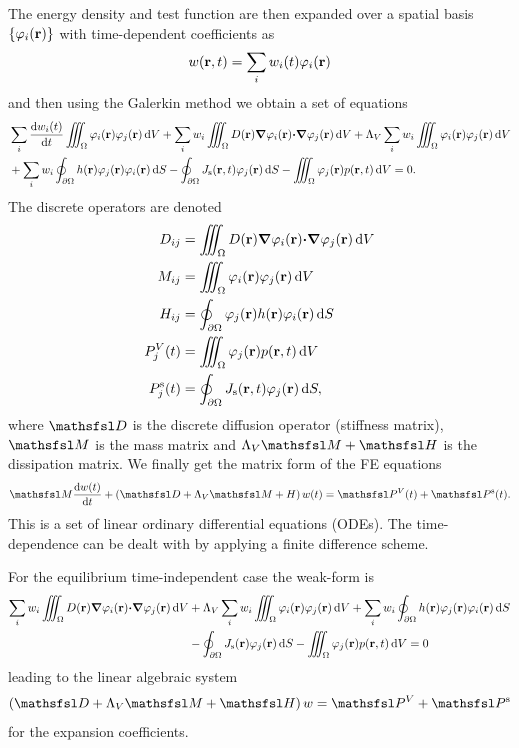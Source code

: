 \documentclass[a4paper]{article}
\numberwithin{equation}{section}
\providecommand\oiint{\oint}
\begin{document}
The energy density and test function are then expanded over a spatial basis 
$\left\{\varphi_i(\boldsymbol{\mathrm{r}})\right\}$ with time-dependent coefficients as
\begin{align}
w(\boldsymbol{\mathrm{r}},t) = \sum_{i} w_i(t) \varphi_i(\boldsymbol{\mathrm{r}})
\end{align}
and then using the Galerkin method we obtain a set of equations
\begin{align}
&\sum_{i} \frac{\rd w_i(t)}{\rd t}\iiint_{\Omega} \varphi_i\pr\varphi_j\pr\dif{V}
+\sum_{i} w_i\iiint_{\Omega} D\pr{\vnabla}\varphi_i\pr{\vcdot}{\vnabla}\varphi_j\pr\dif{V}
+\Lambda_V \sum_{i} w_i\iiint_{\Omega} \varphi_i\pr\varphi_j\pr\dif{V} \nonumber \\
&+\sum_{i} w_i\oiint_{\partial\Omega } h\pr\varphi_j\pr\varphi_i\pr\dif{S}
-\oiint_{\partial\Omega} J_\rs\prt\varphi_j\pr\dif{S}
-\iiint_{\Omega} \varphi_j\pr p\prt\dif{V}=0.
\end{align}
The discrete operators are denoted
\begin{align}
D_{ij} &= \iiint_{\Omega} D\pr{\vnabla}\varphi_i\pr{\vcdot}{\vnabla}\varphi_j\pr\dif{V} \\
M_{ij} &= \iiint_{\Omega} \varphi_i\pr\varphi_j\pr\dif{V} \\
H_{ij} &= \oiint_{\partial\Omega} \varphi_j\pr h\pr \varphi_i\pr\dif{S} \\
P_j^V(t) &= \iiint_{\Omega} \varphi_j\pr p\prt \dif{V} \\
P_j^\rs(t) &= \oiint_{\partial\Omega} J_\rs\prt\varphi_j\pr\dif{S},
\end{align}
where $\mD$ is the discrete diffusion operator (stiffness matrix), $\mM$ is the mass
matrix and $\Lambda_V\mM+\mH$ is the dissipation matrix. We finally get the
matrix form of the FE equations
\begin{align}
\mM\frac{\rd w(t)}{\rd t} 
+\left(\mD+\Lambda_V\mM+H\right)w(t)
=\mP^V(t)+\mP^\rs(t).
\end{align}
This is a set of linear ordinary differential equations (ODEs). The time-dependence can be dealt 
with by applying a finite difference scheme.

For the equilibrium time-independent case the weak-form is
\begin{align}
\sum_{i} w_i\iiint_{\Omega} D\pr{\vnabla}\varphi_i\pr{\vcdot}{\vnabla}\varphi_j\pr\dif{V}
&+\Lambda_V\sum_{i} w_i\iiint_{\Omega} \varphi_i\pr\varphi_j\pr\dif{V}
+\sum_{i} w_i\oiint_{\partial\Omega} h\pr\varphi_j\pr\varphi_i\pr\dif{S} \nonumber\\
&-\oiint_{\partial\Omega} J_\rs\pr\varphi_j\pr\dif{S}
-\iiint_{\Omega} \varphi_j\pr p\prt\dif{V}=0
\end{align}
leading to the linear algebraic system
\begin{align}
\left(\mD+\Lambda_V\mM+\mH\right)w=\mP^V+\mP^\rs
\end{align}
for the expansion coefficients.
\end{document}
